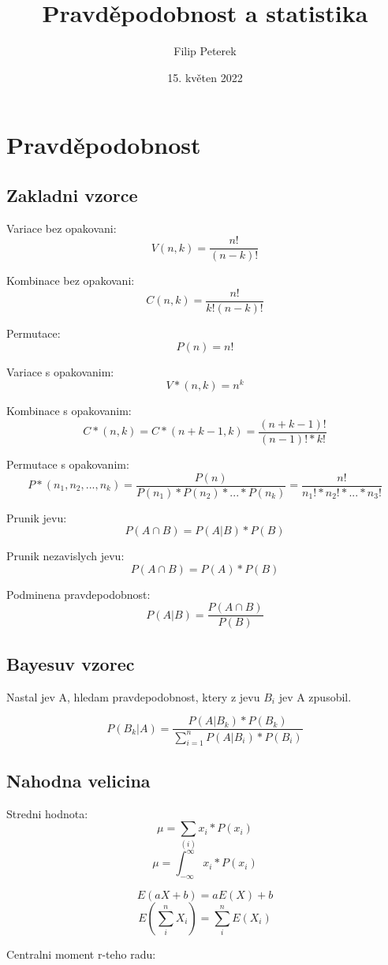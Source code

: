 \documentclass{article}
\title{Pravděpodobnost a statistika}
\date{15. květen 2022}
\author{Filip Peterek}
\begin{document}
\maketitle

\section{Pravděpodobnost}

\subsection{Zakladni vzorce}

Variace bez opakovani: \[V(n,k) = \frac{n!}{(n-k)!}\]

Kombinace bez opakovani: \[C(n,k) = \frac{n!}{k!(n-k)!}\]

Permutace: \[P(n) = n!\]

Variace s opakovanim: \[V*(n,k) = n^k\]

Kombinace s opakovanim: \[C*(n,k) = C*(n+k-1, k) = \frac{(n+k-1)!}{(n-1)! * k!}\]

Permutace s opakovanim: \[P*(n_1, n_2, ..., n_k) = \frac{P(n)}{P(n_1) * P(n_2) * ... * P(n_k)} = \frac{n!}{n_1! * n_2! * ... * n_3!} \]

Prunik jevu: \[P(A \cap B) = P(A|B) * P(B)\]

Prunik nezavislych jevu: \[P(A \cap B) = P(A) * P(B)\]

Podminena pravdepodobnost: \[P(A|B) = \frac{P(A \cap B)}{P(B)}\]

\subsection {Bayesuv vzorec}

Nastal jev A, hledam pravdepodobnost, ktery z jevu $B_i$ jev A zpusobil.

\[ P(B_k|A) = \frac{P(A|B_k) * P(B_k)}{ \sum_{i=1}^{n} P(A|B_i) * P(B_i) } \]
 
\subsection{Nahodna velicina}

Stredni hodnota: 
\[ \mu = \sum_{(i)} x_i * P(x_i) \]
\[ \mu = \int_{-\infty}^{\infty} x_i * P(x_i) \]

\[ E(aX + b) = aE(X) + b \]
\[ E(\sum_i^n X_i) = \sum_i^n E(X_i) \]

Centralni moment r-teho radu:
\end{document}
